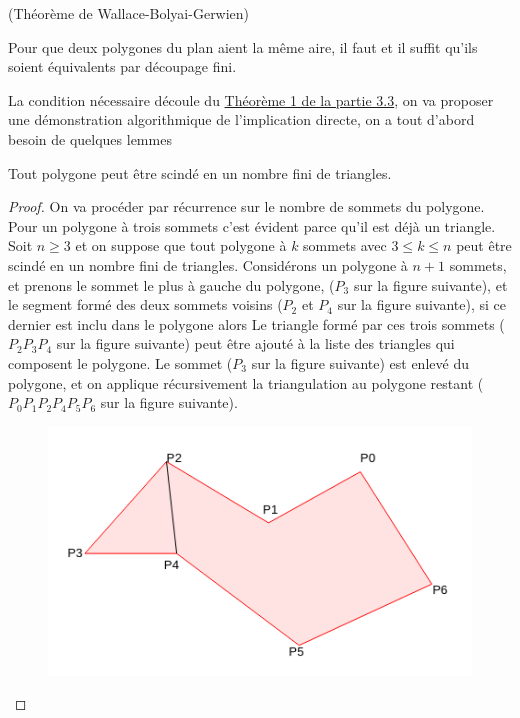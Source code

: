 \begin{kkk}(Théorème de Wallace-Bolyai-Gerwien)\label{wbg}\cite{cite6}
  \hfill

\noindent
Pour que deux polygones du plan aient la même aire, il faut et il suffit qu'ils soient équivalents par découpage fini.
\end{kkk}
\noindent
La condition nécessaire découle du \hyperref[pr]{Théorème 1 de la partie 3.3}, on va proposer une démonstration algorithmique de l'implication directe, on a tout d'abord besoin de quelques lemmes
\begin{li}
Tout polygone peut être scindé en un nombre fini de triangles.
\end{li}
\begin{proof}
  \hfill

  \noindent
  On va procéder par récurrence sur le nombre de sommets du polygone. Pour un polygone à trois sommets c'est évident parce qu'il est déjà un triangle. Soit $n\ge 3$ et on suppose que tout polygone à $k$ sommets avec $ 3 \le k \le n$ peut être scindé en un nombre fini de triangles.
  Considérons un polygone à $n+1$ sommets, et prenons le sommet le plus à gauche du polygone, ($P_3$ sur la figure suivante), et le segment formé des deux sommets voisins ($P_2$ et $P_4$ sur la figure suivante), si ce dernier est inclu dans le polygone alors Le triangle formé par ces trois sommets ($P_2P_3P_4$ sur la figure suivante) peut être ajouté à la liste des triangles qui composent le polygone. Le sommet ($P_3$ sur la figure suivante) est enlevé du polygone, et on applique récursivement la triangulation au polygone restant ($P_0P_1P_2P_4P_5P_6$ sur la figure suivante).
  \begin{figure}[h]
      \centering
      \includegraphics[scale=0.6]{images/x5.png}

  \end{figure}


\end{proof}

